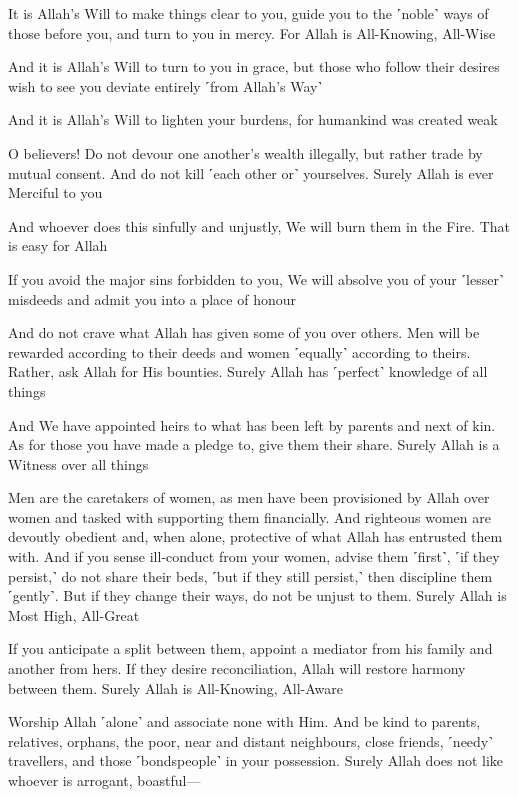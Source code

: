 It is Allah’s Will to make things clear to you, guide you to the ˹noble˺ ways of those before you, and turn to you in mercy. For Allah is All-Knowing, All-Wise

And it is Allah’s Will to turn to you in grace, but those who follow their desires wish to see you deviate entirely ˹from Allah’s Way˺

And it is Allah’s Will to lighten your burdens, for humankind was created weak

O believers! Do not devour one another’s wealth illegally, but rather trade by mutual consent. And do not kill ˹each other or˺ yourselves. Surely Allah is ever Merciful to you

And whoever does this sinfully and unjustly, We will burn them in the Fire. That is easy for Allah

If you avoid the major sins forbidden to you, We will absolve you of your ˹lesser˺ misdeeds and admit you into a place of honour

And do not crave what Allah has given some of you over others. Men will be rewarded according to their deeds and women ˹equally˺ according to theirs. Rather, ask Allah for His bounties. Surely Allah has ˹perfect˺ knowledge of all things

And We have appointed heirs to what has been left by parents and next of kin. As for those you have made a pledge to, give them their share. Surely Allah is a Witness over all things

Men are the caretakers of women, as men have been provisioned by Allah over women and tasked with supporting them financially. And righteous women are devoutly obedient and, when alone, protective of what Allah has entrusted them with. And if you sense ill-conduct from your women, advise them ˹first˺, ˹if they persist,˺ do not share their beds, ˹but if they still persist,˺ then discipline them ˹gently˺. But if they change their ways, do not be unjust to them. Surely Allah is Most High, All-Great

If you anticipate a split between them, appoint a mediator from his family and another from hers. If they desire reconciliation, Allah will restore harmony between them. Surely Allah is All-Knowing, All-Aware

Worship Allah ˹alone˺ and associate none with Him. And be kind to parents, relatives, orphans, the poor, near and distant neighbours, close friends, ˹needy˺ travellers, and those ˹bondspeople˺ in your possession. Surely Allah does not like whoever is arrogant, boastful—


